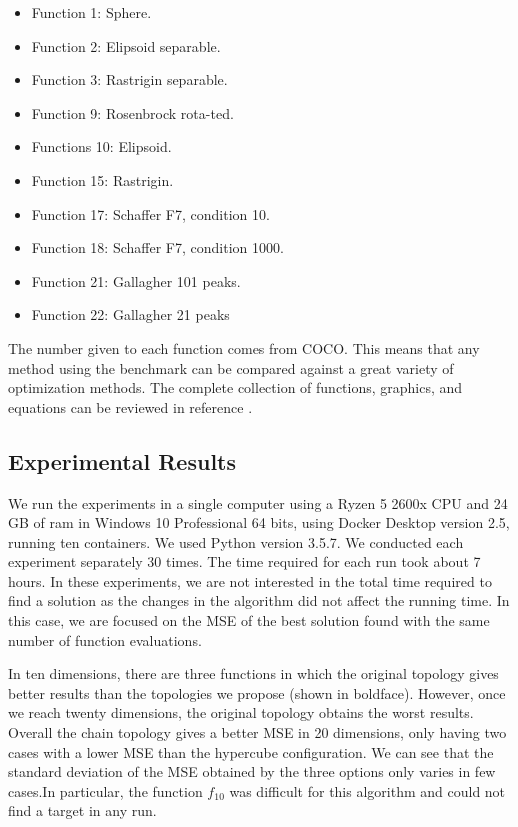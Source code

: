 \documentclass[runningheads]{llncs}
\begin{document}
\begin{multicols}{2}
\begin{itemize}

    \item Function 1: Sphere.
    \item Function 2: Elipsoid separable.
    \item Function 3: Rastrigin separable.
    \item Function 9: Rosenbrock rota-ted.
    \item Functions 10: Elipsoid.
    \item Function 15: Rastrigin.
    \item Function 17: Schaffer F7, condition 10.
    \item Function 18: Schaffer F7, condition 1000.
    \item Function 21: Gallagher 101 peaks.
    \item Function 22: Gallagher 21 peaks

\end{itemize}
\end{multicols}

The number given to each function comes from COCO. This means that any method
using the benchmark can be compared against a great variety of optimization
methods. The complete collection of functions, graphics, and equations can be
reviewed in reference \cite{bbob}.


\subsection{Experimental Results}

We run the experiments in a single computer using a Ryzen 5 2600x CPU and 24 GB
of ram in Windows 10 Professional 64 bits, using Docker Desktop version 2.5,
running ten containers. We used Python version 3.5.7. We conducted each
experiment separately 30 times. The time required for each run took about 7
hours. In these experiments, we are not interested in the total time required to
find a solution as the changes in the algorithm did not affect the running time.
In this case, we are focused on the MSE of the best solution found with the same
number of function evaluations.

In ten dimensions, there are three functions in which the original topology
gives better results than the topologies we propose (shown in boldface).
However, once we reach twenty dimensions, the original topology obtains the
worst results. Overall the chain topology gives a better MSE in 20 dimensions,
only having two cases with a lower MSE than the hypercube configuration. We can
see that the standard deviation of the MSE obtained by the three options only
varies in few cases.In particular, the function $f_{10}$ was difficult for this
algorithm and could not find a target in any run.  
\end{document}

